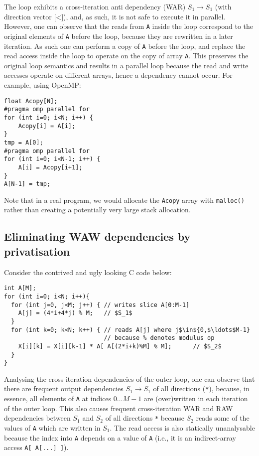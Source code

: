 The loop exhibits a cross-iteration anti dependency (WAR) $S_1\to S_1$
(with direction vector $\texttt{[<]}$), and, as such, it is not safe
to execute it in parallel. However, one can observe that the reads
from \texttt{A} inside the loop correspond to the original elements of
\texttt{A} before the loop, because they are rewritten in a later
iteration.  As such one can perform a copy of \texttt{A} before the
loop, and replace the read access inside the loop to operate on the
copy of array \texttt{A}. This preserves the original loop semantics
and results in a parallel loop because the read and write accesses
operate on different arrays, hence a dependency cannot occur. For
example, using OpenMP:

\begin{lstlisting}[mathescape=true]
float Acopy[N];
#pragma omp parallel for
for (int i=0; i<N; i++) {
    Acopy[i] = A[i];
}
tmp = A[0];
#pragma omp parallel for
for (int i=0; i<N-1; i++) {
    A[i] = Acopy[i+1];
}
A[N-1] = tmp;
\end{lstlisting}

Note that in a real program, we would allocate the \texttt{Acopy}
array with \texttt{malloc()} rather than creating a potentially very
large stack allocation.

\subsection{Eliminating WAW dependencies by privatisation}

Consider the contrived and ugly looking C code below:

\begin{lstlisting}[mathescape=true]
int A[M];
for (int i=0; i<N; i++){
  for (int j=0, j<M; j++) { // writes slice A[0:M-1]
    A[j] = (4*i+4*j) % M;   // $S_1$
  }
  for (int k=0; k<N; k++) { // reads A[j] where j$\in${0,$\ldots$M-1}
                            // because % denotes modulus op
    X[i][k] = X[i][k-1] * A[ A[(2*i+k)%M] % M];      // $S_2$
  }
}
\end{lstlisting}

Analysing the cross-iteration dependencies of the outer loop,
one can observe that there are frequent output dependencies
$S_1\to S_1$ of all directions (\texttt{*}), because, in
essence, all elements of \texttt{A} at indices $0\ldots M-1$
are (over)written in each iteration of the outer loop.
This also causes frequent cross-iteration WAR and RAW
dependencies between $S_1$ and $S_2$ of all directions
\texttt{*} because $S_2$ reads some of the values of
\texttt{A} which are written in $S_1$. The read access
is also statically unanalysable because the index
into \texttt{A} depends on a value of \texttt{A} (i.e.,
it is an indirect-array access \texttt{A[ A[...] ]}).

